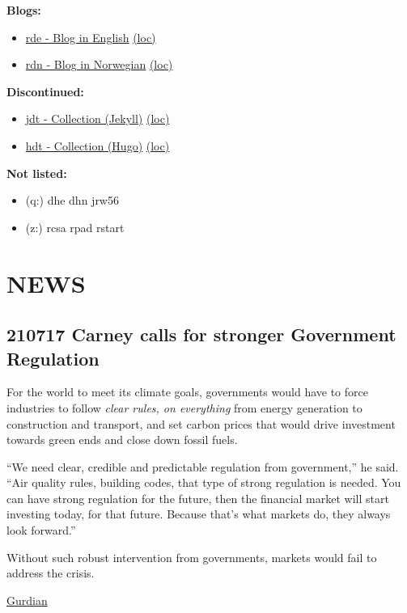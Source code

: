 \documentclass[
]{book}
\providecommand{\tightlist}{%
  \setlength{\itemsep}{0pt}\setlength{\parskip}{0pt}}
\begin{document}
\textbf{Blogs:}

\begin{itemize}
\tightlist
\item
  \href{https://dyrehaugen.github.io/rde}{rde - Blog in English} \href{http://localhost/rde}{(loc)}
\item
  \href{https://dyrehaugen.github.io/rdn}{rdn - Blog in Norwegian} \href{http://localhost/rdn}{(loc)}
\end{itemize}

\textbf{Discontinued:}

\begin{itemize}
\tightlist
\item
  \href{https://dyrehaugen.github.io/jdt}{jdt - Collection (Jekyll)} \href{http://localhost/jdt}{(loc)}
\item
  \href{https://dyrehaugen.github.io/hdt}{hdt - Collection (Hugo)} \href{http://localhost/hdt}{(loc)}
\end{itemize}

\textbf{Not listed:}

\begin{itemize}
\tightlist
\item
  (q:) dhe dhn jrw56
\item
  (z:) rcsa rpad rstart
\end{itemize}

\hypertarget{news}{%
\chapter{NEWS}\label{news}}

\hypertarget{carney-calls-for-stronger-government-regulation}{%
\section{210717 Carney calls for stronger Government Regulation}\label{carney-calls-for-stronger-government-regulation}}

For the world to meet its climate goals, governments would have to force industries to follow \emph{clear rules, on everything} from energy generation to construction and transport, and set carbon prices that would drive investment towards green ends and close down fossil fuels.

``We need clear, credible and predictable regulation from government,'' he said. ``Air quality rules, building codes, that type of strong regulation is needed. You can have strong regulation for the future, then the financial market will start investing today, for that future. Because that's what markets do, they always look forward.''

Without such robust intervention from governments, markets would fail to address the crisis.

\href{https://www.theguardian.com/environment/2021/jul/17/regulate-business-to-tackle-climate-crisis-urges-mark-carney}{Gurdian}

  
\end{document}
